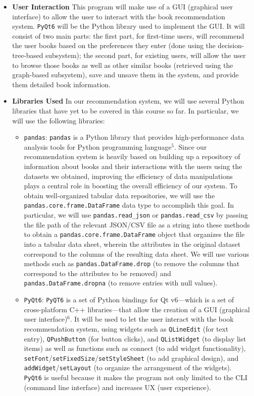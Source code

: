 \documentclass[fontsize=11pt]{article}
\begin{document}
\begin{itemize}
\item \textbf{User Interaction }This program will make use of a GUI (graphical user interface) to allow the user to interact with the book recommendation system. \texttt{PyQt6} will be the Python library used to implement the GUI. It will consist of two main parts: the first part, for first-time users, will recommend the user books based on the preferences they enter (done using the decision-tree-based subsystem); the second part, for existing users, will allow the user to browse those books as well as other similar books (retrieved using the graph-based subsystem), save and unsave them in the system, and provide them detailed book information.

\item \textbf{Libraries Used }In our recommendation system, we will use several Python libraries that have yet to be covered in this course so far. In particular, we will use the following libraries:
\begin{itemize}
\item \texttt{pandas}: \texttt{pandas} is a Python library that provides high-performance data analysis tools for Python programming language$^5$. Since our recommendation system is heavily based on building up a repository of information about books and their interactions with the users using the datasets we obtained, improving the efficiency of data manipulations plays a central role in boosting the overall efficiency of our system. To obtain well-organized tabular data repositories, we will use the \texttt{pandas.core.frame.DataFrame} data type to accomplish this goal. In particular, we will use \texttt{pandas.read\_json} or \texttt{pandas.read\_csv} by passing the file path of the relevant JSON/CSV file as a string into these methods to obtain a \texttt{pandas.core.frame.DataFrame} object that organizes the file into a tabular data sheet, wherein the attributes in the original dataset correspond to the columns of the resulting data sheet. We will use various methods such as \texttt{pandas.DataFrame.drop} (to remove the columns that correspond to the attributes to be removed) and \texttt{pandas.DataFrame.dropna} (to remove entries with null values).
\item \texttt{PyQt6}: \texttt{PyQT6} is a set of Python bindings for Qt v6—which is a set of cross-platform C++ libraries—that allow the creation of a GUI (graphical user interface)$^6$. It will be used to let the user interact with the book recommendation system, using widgets such as \texttt{QLineEdit} (for text entry), \texttt{QPushButton} (for button clicks), and \texttt{QListWidget} (to display list items) as well as functions such as connect (to add widget functionality), \texttt{setFont}/\texttt{setFixedSize}/\texttt{setStyleSheet} (to add graphical design), and \texttt{addWidget}/\texttt{setLayout} (to organize the arrangement of the widgets). \texttt{PyQt6} is useful because it makes the program not only limited to the CLI (command line interface) and increases UX (user experience).

\end{itemize}
\end{itemize}
\end{document}
